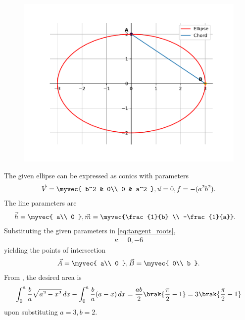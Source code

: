 	\begin{figure}[H]
		\centering
 \includegraphics[width=0.75\columnwidth]{chapters/12/8/3/8/figs/fig.pdf}
		\caption{}
		\label{fig:12/8/3/8}
  	\end{figure}
The given ellipse can be expressed as conics with parameters
\begin{align}
\vec{V}=\myvec{
b^2 & 0\\
0 & a^2
},
\vec{u}=0,
f=-(a^2b^2).
\end{align} 
The line parameters are
\begin{align}
\vec{h} &= \myvec{
a\\
0
},
\vec{m} = \myvec{\frac{1}{b} \\ -\frac{1}{a}}.
\end{align}
Substituting the given parameters in \eqref{eq:tangent_roots},
\begin{align}
    \kappa=0,-6
\end{align}
yielding the points of intersection
\begin{align}
    \vec{A}=\myvec{
a\\
0
    },
    \vec{B}=\myvec{
0\\
b
    }.
\end{align}
From 
		,
the desired area is
\begin{align}
\int_{0}^{a}\frac{b}{a}\sqrt{a^2-x^2} \,dx 
-\int_{0}^{a} \frac{b}{a}(a-x) \,dx
	= \frac{ab}{2}\brak{\frac{\pi}{2}-1}
	= 3\brak{\frac{\pi}{2}-1}
\end{align}
upon substituting $a=3, b=2$.
